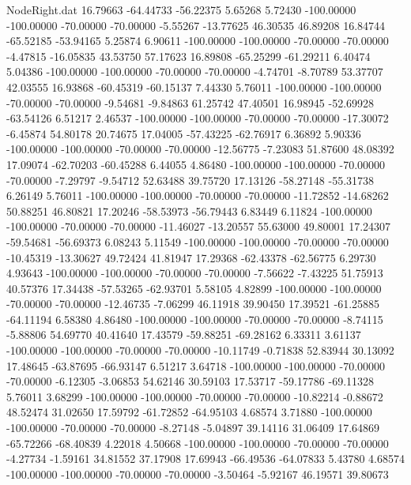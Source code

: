 \begin{filecontents}{NodeRight.dat}
  16.79663  -64.44733  -56.22375     5.65268    5.72430 -100.00000 -100.00000  -70.00000  -70.00000   -5.55267  -13.77625   46.30535   46.89208
  16.84744  -65.52185  -53.94165     5.25874    6.90611 -100.00000 -100.00000  -70.00000  -70.00000   -4.47815  -16.05835   43.53750   57.17623
  16.89808  -65.25299  -61.29211     6.40474    5.04386 -100.00000 -100.00000  -70.00000  -70.00000   -4.74701   -8.70789   53.37707   42.03555
  16.93868  -60.45319  -60.15137     7.44330    5.76011 -100.00000 -100.00000  -70.00000  -70.00000   -9.54681   -9.84863   61.25742   47.40501
  16.98945  -52.69928  -63.54126     6.51217    2.46537 -100.00000 -100.00000  -70.00000  -70.00000  -17.30072   -6.45874   54.80178   20.74675
  17.04005  -57.43225  -62.76917     6.36892    5.90336 -100.00000 -100.00000  -70.00000  -70.00000  -12.56775   -7.23083   51.87600   48.08392
  17.09074  -62.70203  -60.45288     6.44055    4.86480 -100.00000 -100.00000  -70.00000  -70.00000   -7.29797   -9.54712   52.63488   39.75720
  17.13126  -58.27148  -55.31738     6.26149    5.76011 -100.00000 -100.00000  -70.00000  -70.00000  -11.72852  -14.68262   50.88251   46.80821
  17.20246  -58.53973  -56.79443     6.83449    6.11824 -100.00000 -100.00000  -70.00000  -70.00000  -11.46027  -13.20557   55.63000   49.80001
  17.24307  -59.54681  -56.69373     6.08243    5.11549 -100.00000 -100.00000  -70.00000  -70.00000  -10.45319  -13.30627   49.72424   41.81947
  17.29368  -62.43378  -62.56775     6.29730    4.93643 -100.00000 -100.00000  -70.00000  -70.00000   -7.56622   -7.43225   51.75913   40.57376
  17.34438  -57.53265  -62.93701     5.58105    4.82899 -100.00000 -100.00000  -70.00000  -70.00000  -12.46735   -7.06299   46.11918   39.90450
  17.39521  -61.25885  -64.11194     6.58380    4.86480 -100.00000 -100.00000  -70.00000  -70.00000   -8.74115   -5.88806   54.69770   40.41640
  17.43579  -59.88251  -69.28162     6.33311    3.61137 -100.00000 -100.00000  -70.00000  -70.00000  -10.11749   -0.71838   52.83944   30.13092
  17.48645  -63.87695  -66.93147     6.51217    3.64718 -100.00000 -100.00000  -70.00000  -70.00000   -6.12305   -3.06853   54.62146   30.59103
  17.53717  -59.17786  -69.11328     5.76011    3.68299 -100.00000 -100.00000  -70.00000  -70.00000  -10.82214   -0.88672   48.52474   31.02650
  17.59792  -61.72852  -64.95103     4.68574    3.71880 -100.00000 -100.00000  -70.00000  -70.00000   -8.27148   -5.04897   39.14116   31.06409
  17.64869  -65.72266  -68.40839     4.22018    4.50668 -100.00000 -100.00000  -70.00000  -70.00000   -4.27734   -1.59161   34.81552   37.17908
  17.69943  -66.49536  -64.07833     5.43780    4.68574 -100.00000 -100.00000  -70.00000  -70.00000   -3.50464   -5.92167   46.19571   39.80673

\end{filecontents}
